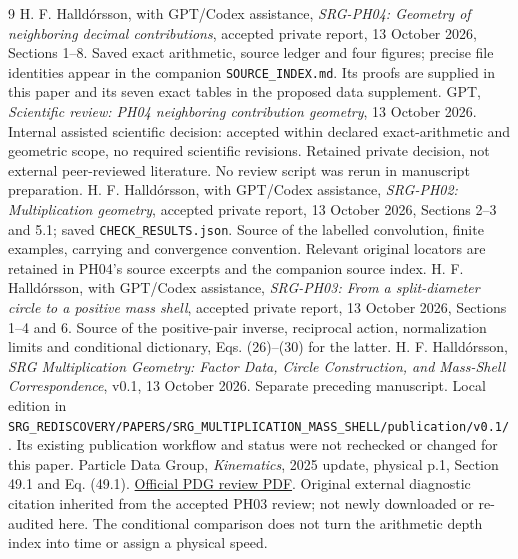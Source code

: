 \documentclass[11pt,a4paper]{article}
\begin{document}
\clearpage
\begin{thebibliography}{9}
H. F. Halldórsson, with GPT/Codex assistance, \emph{SRG-PH04: Geometry of neighboring decimal contributions}, accepted private report, 13 October 2026, Sections 1--8. Saved exact arithmetic, source ledger and four figures; precise file identities appear in the companion \texttt{SOURCE\_INDEX.md}. Its proofs are supplied in this paper and its seven exact tables in the proposed data supplement.
GPT, \emph{Scientific review: PH04 neighboring contribution geometry}, 13 October 2026. Internal assisted scientific decision: accepted within declared exact-arithmetic and geometric scope, no required scientific revisions. Retained private decision, not external peer-reviewed literature. No review script was rerun in manuscript preparation.
H. F. Halldórsson, with GPT/Codex assistance, \emph{SRG-PH02: Multiplication geometry}, accepted private report, 13 October 2026, Sections 2--3 and 5.1; saved \texttt{CHECK\_RESULTS.json}. Source of the labelled convolution, finite examples, carrying and convergence convention. Relevant original locators are retained in PH04's source excerpts and the companion source index.
H. F. Halldórsson, with GPT/Codex assistance, \emph{SRG-PH03: From a split-diameter circle to a positive mass shell}, accepted private report, 13 October 2026, Sections 1--4 and 6. Source of the positive-pair inverse, reciprocal action, normalization limits and conditional dictionary, Eqs. (26)--(30) for the latter.
H. F. Halldórsson, \emph{SRG Multiplication Geometry: Factor Data, Circle Construction, and Mass-Shell Correspondence}, v0.1, 13 October 2026. Separate preceding manuscript. Local edition in \texttt{SRG\_REDISCOVERY/PAPERS/}\allowbreak\texttt{SRG\_MULTIPLICATION\_MASS\_SHELL/}\allowbreak\texttt{publication/v0.1/}. Its existing publication workflow and status were not rechecked or changed for this paper.
Particle Data Group, \emph{Kinematics}, 2025 update, physical p.1, Section 49.1 and Eq. (49.1). \href{https://pdg.lbl.gov/2025/reviews/rpp2025-rev-kinematics.pdf}{Official PDG review PDF}. Original external diagnostic citation inherited from the accepted PH03 review; not newly downloaded or re-audited here. The conditional comparison does not turn the arithmetic depth index into time or assign a physical speed.
\end{thebibliography}
\end{document}
